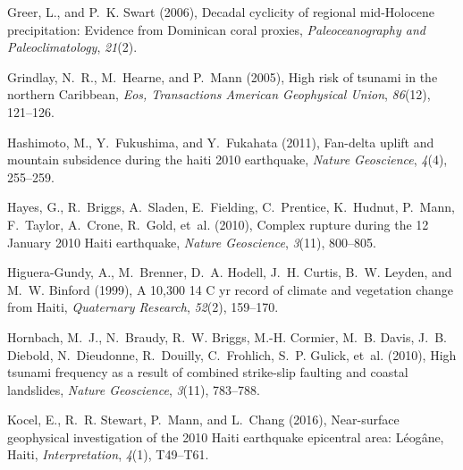 \documentclass[linenumbers,draft]{agujournal}
\begin{document}
\begin{thebibliography}{65}
Greer, L., and P.~K. Swart (2006), {Decadal cyclicity of regional mid-Holocene
  precipitation: Evidence from Dominican coral proxies},
  \textit{Paleoceanography and Paleoclimatology}, \textit{21}(2).

Grindlay, N.~R., M.~Hearne, and P.~Mann (2005), {High risk of tsunami in the
  northern Caribbean}, \textit{Eos, Transactions American Geophysical Union},
  \textit{86}(12), 121--126.

Hashimoto, M., Y.~Fukushima, and Y.~Fukahata (2011), Fan-delta uplift and
  mountain subsidence during the haiti 2010 earthquake, \textit{Nature
  Geoscience}, \textit{4}(4), 255--259.

Hayes, G., R.~Briggs, A.~Sladen, E.~Fielding, C.~Prentice, K.~Hudnut, P.~Mann,
  F.~Taylor, A.~Crone, R.~Gold, et~al. (2010), Complex rupture during the 12
  {January 2010 Haiti} earthquake, \textit{Nature Geoscience}, \textit{3}(11),
  800--805.

Higuera-Gundy, A., M.~Brenner, D.~A. Hodell, J.~H. Curtis, B.~W. Leyden, and
  M.~W. Binford (1999), A 10,300 14 {C yr record of climate and vegetation
  change from Haiti}, \textit{Quaternary Research}, \textit{52}(2), 159--170.

Hornbach, M.~J., N.~Braudy, R.~W. Briggs, M.-H. Cormier, M.~B. Davis, J.~B.
  Diebold, N.~Dieudonne, R.~Douilly, C.~Frohlich, S.~P. Gulick, et~al. (2010),
  High tsunami frequency as a result of combined strike-slip faulting and
  coastal landslides, \textit{Nature Geoscience}, \textit{3}(11), 783--788.

Kocel, E., R.~R. Stewart, P.~Mann, and L.~Chang (2016), {Near-surface
  geophysical investigation of the 2010 Haiti earthquake epicentral area:
  L{\'e}og{\^a}ne, Haiti}, \textit{Interpretation}, \textit{4}(1), T49--T61.


\end{thebibliography}
\end{document}
